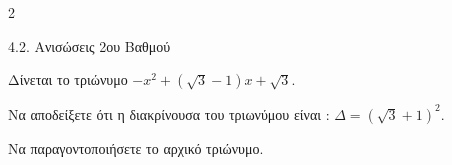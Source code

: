 \begin{ylh}{2}
    \item 4.2. Ανισώσεις 2ου Βαθμού
\end{ylh}
Δίνεται το τριώνυμο $- x^{2} + \left( \sqrt{3} - 1 \right)x + \sqrt{3}.$

\begin{alist}
\item Να αποδείξετε ότι η διακρίνουσα του τριωνύμου είναι : $\Delta = \left( \sqrt{3} + 1 \right)^{2}.$
\item Να παραγοντοποιήσετε το αρχικό τριώνυμο.
\end{alist}

